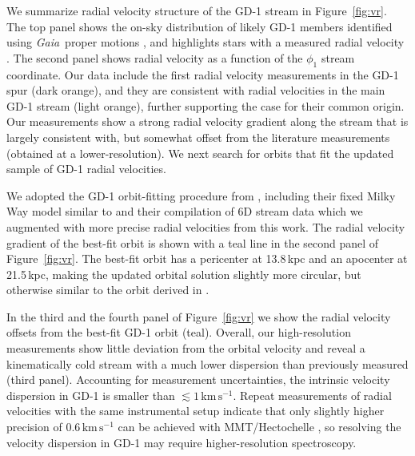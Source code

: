 \documentclass[twocolumn]{aastex63}
\newcommand{\gaia}{\textsl{Gaia}}
\newcommand{\kms}{\ensuremath{\textrm{km}\,\textrm{s}^{-1}}}
\begin{document}
We summarize radial velocity structure of the GD-1 stream in Figure~\ref{fig:vr}.
The top panel shows the on-sky distribution of likely GD-1 members identified using \gaia\ proper motions \citep[small points,][]{pwb}, and highlights stars with a measured radial velocity \citep[orange for this work, gray for literature data from][]{koposov2010}.
The second panel shows radial velocity as a function of the $\phi_1$ stream coordinate.
Our data include the first radial velocity measurements in the GD-1 spur (dark orange), and they are consistent with radial velocities in the main GD-1 stream (light orange), further supporting the case for their common origin.
Our measurements show a strong radial velocity gradient along the stream that is largely consistent with, but somewhat offset from the literature measurements (obtained at a lower-resolution).
We next search for orbits that fit the updated sample of GD-1 radial velocities.

We adopted the GD-1 orbit-fitting procedure from \citet{pwb}, including their fixed Milky Way model similar to \citet{bovy2015} and their compilation of 6D stream data which we augmented with more precise radial velocities from this work.
The radial velocity gradient of the best-fit orbit is shown with a teal line in the second panel of Figure~\ref{fig:vr}.
The best-fit orbit has a pericenter at 13.8\,kpc and an apocenter at 21.5\,kpc, making the updated orbital solution slightly more circular, but otherwise similar to the orbit derived in \citet{pwb}.

In the third and the fourth panel of Figure~\ref{fig:vr} we show the radial velocity offsets from the best-fit GD-1 orbit (teal).
Overall, our high-resolution measurements show little deviation from the orbital velocity and reveal a kinematically cold stream with a much lower dispersion than previously measured (third panel).
Accounting for measurement uncertainties, the intrinsic velocity dispersion in GD-1 is smaller than $\lesssim1\,\kms$.
Repeat measurements of radial velocities with the same instrumental setup indicate that only slightly higher precision of $0.6\,\kms$ can be achieved with MMT/Hectochelle \citep{cargile2019}, so resolving the velocity dispersion in GD-1 may require higher-resolution spectroscopy.

\end{document}

